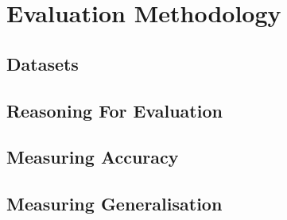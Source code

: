 \chapter{Evaluation Methodology}
\label{eval_method}

\section{Datasets}

\section{Reasoning For Evaluation}

\section{Measuring Accuracy}

\section{Measuring Generalisation}

